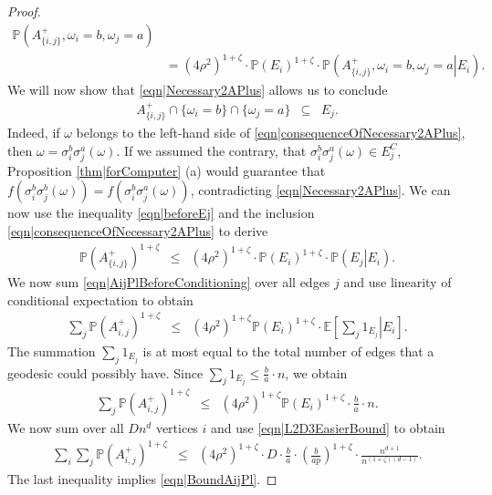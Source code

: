 \documentclass[reqno]{amsart}
\begin{document}
\begin{proof}
\begin{align}
\mathbb P\left(A_{\{i,j\}}^+,\omega_i=b,\omega_j=a\right)\\  
&=
(4\rho^2)^{1+\zeta}\cdot \mathbb P(E_i)^{1+\zeta} \cdot 
\mathbb P\left(\left.A_{\{i,j\}}^+,\omega_i=b,\omega_j=a\right|E_i\right).  \label{eqn|beforeEj}
\end{align}
We will now show that \eqref{eqn|Necessary2APlus} allows us to conclude  
\begin{eqnarray}A_{\{i,j\}}^+\cap\{\omega_i=b\}\cap\{\omega_j=a\} & \subseteq & E_j.
\label{eqn|consequenceOfNecessary2APlus} 
\end{eqnarray} 
Indeed, if $\omega$ belongs to the left-hand side of \eqref{eqn|consequenceOfNecessary2APlus}, then 
$\omega=\sigma_i^b\sigma_j^a(\omega)$. If we assumed the contrary, that $\sigma_i^b\sigma_j^a(\omega)\in E_j^C$, Proposition \ref{thm|forComputer} (a) would guarantee that $f(\sigma_i^b\sigma_j^b(\omega))=
f(\sigma_i^b\sigma_j^a(\omega))$, contradicting \eqref{eqn|Necessary2APlus}. We can now use
the inequality \eqref{eqn|beforeEj} and the inclusion 
\eqref{eqn|consequenceOfNecessary2APlus} to derive  
\begin{eqnarray}
\mathbb P\left(A_{\{i,j\}}^+\right)^{1+\zeta} 
&\leq& (
4\rho^2)^{1+\zeta}\cdot \mathbb P(E_i)^{1+\zeta} \cdot 
\mathbb P\left(\left.E_j\right|E_i\right).
\label{eqn|AijPlBeforeConditioning}
\end{eqnarray}
We now sum \eqref{eqn|AijPlBeforeConditioning} over all edges $j$ and use linearity of conditional expectation to obtain
\begin{eqnarray*}
\sum_j\mathbb P\left(A_{i,j}^+\right)^{1+\zeta}&\leq& (4\rho^2)^{1+\zeta}\mathbb P\left(E_i\right)^{1+\zeta}\cdot \mathbb E\left[\left.
\sum_j 1_{E_j}\right|E_i
\right].
\end{eqnarray*} 
The summation $\sum_j1_{E_j}$ is at most equal to the total number of edges that a geodesic could possibly have. Since $\sum_j1_{E_j}\leq \frac ba\cdot n$, we obtain 
\begin{eqnarray*}
\sum_j\mathbb P\left(A_{i,j}^+\right)^{1+\zeta}&\leq& (4\rho^2)^{1+\zeta}\mathbb P\left(E_i\right)^{1+\zeta}\cdot \frac ba\cdot n.
\end{eqnarray*} 
We now sum over all $Dn^d$ vertices $i$ and use \eqref{eqn|L2D3EasierBound} to obtain
\begin{eqnarray*}
\sum_i\sum_j\mathbb P\left(A_{i,j}^+\right)^{1+\zeta}&\leq& (4\rho^2)^{1+\zeta}\cdot D\cdot \frac ba\cdot\left(\frac{b}{ap}\right)^{1+\zeta} \cdot \frac{n^{d+1}}{n^{(1+\zeta)(d-1)}}.
\end{eqnarray*} 
The last inequality implies \eqref{eqn|BoundAijPl}.
\end{proof}
\end{document}
